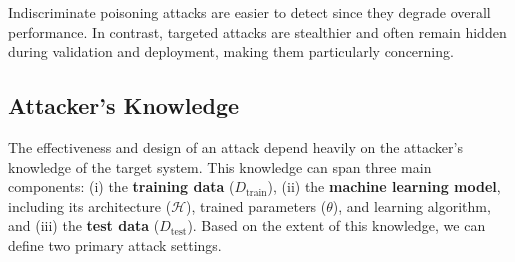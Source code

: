 \documentclass[11pt]{report}
\begin{document}
\noindent
Indiscriminate poisoning attacks are easier to detect since they degrade overall performance. In contrast, targeted attacks are stealthier and often remain hidden during validation and deployment, making them particularly concerning.
\subsection{Attacker's Knowledge}

The effectiveness and design of an attack depend heavily on the attacker's knowledge of the target system. This knowledge can span three main components: (i) the \textbf{training data} ($D_{\text{train}}$), (ii) the \textbf{machine learning model}, including its architecture ($\mathcal{H}$), trained parameters ($\theta$), and learning algorithm, and (iii) the \textbf{test data} ($D_{\text{test}}$). Based on the extent of this knowledge, we can define two primary attack settings.
\end{document}
